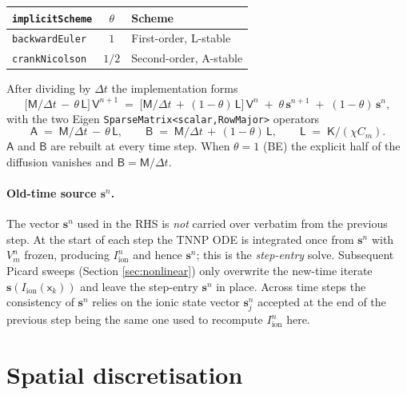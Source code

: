 \documentclass[11pt,a4paper]{article}
\newcommand{\Vm}{V_{m}}
\newcommand{\Iion}{I_{\text{ion}}}
\newcommand{\Aimp}{\mathsf{A}}
\newcommand{\Bimp}{\mathsf{B}}
\newcommand{\Mmass}{\mathsf{M}}
\newcommand{\Kstif}{\mathsf{K}}
\newcommand{\Lop}{\mathsf{L}}
\newcommand{\code}[1]{\texttt{\small #1}}
\begin{document}
\begin{center}
\begin{tabular}{@{}lcl@{}}
\toprule
\code{implicitScheme} & $\theta$ & Scheme \\
\midrule
\code{backwardEuler} & $1$   & First-order, L-stable \\
\code{crankNicolson} & $1/2$ & Second-order, A-stable \\
\bottomrule
\end{tabular}
\end{center}

After dividing by $\Delta t$ the implementation forms
\begin{equation}
  \bigl[\Mmass/\Delta t \,-\, \theta\, \Lop\bigr]\, \mathsf{V}^{n+1}
   \;=\;
   \bigl[\Mmass/\Delta t \,+\, (1-\theta)\, \Lop\bigr]\, \mathsf{V}^{n}
   \;+\; \theta\, \mathbf{s}^{n+1}
   \;+\; (1-\theta)\, \mathbf{s}^{n},
\end{equation}
with the two Eigen \code{SparseMatrix<scalar,RowMajor>} operators
\begin{equation}
  \Aimp \;=\; \Mmass/\Delta t \,-\, \theta\, \Lop,
   \qquad
  \Bimp \;=\; \Mmass/\Delta t \,+\, (1-\theta)\, \Lop,
   \qquad
   \Lop \;=\; \Kstif/(\chi C_{m}).
\end{equation}
$\Aimp$ and $\Bimp$ are rebuilt at every time step. When $\theta = 1$
(BE) the explicit half of the diffusion vanishes and
$\Bimp = \Mmass/\Delta t$.

\paragraph{Old-time source $\mathbf{s}^{n}$.}
The vector $\mathbf{s}^{n}$ used in the RHS is \emph{not} carried over
verbatim from the previous step. At the start of each step the TNNP
ODE is integrated once from $\mathbf{s}^{n}$ with $\Vm^{n}$ frozen,
producing $\Iion^{n}$ and hence $\mathbf{s}^{n}$; this is the
\emph{step-entry} solve. Subsequent Picard sweeps (Section
\ref{sec:nonlinear}) only overwrite the new-time iterate
$\mathbf{s}(\Iion(\mathsf{x}_{k}))$ and leave the step-entry
$\mathbf{s}^{n}$ in place. Across time steps the consistency of
$\mathbf{s}^{n}$ relies on the ionic state vector
$\mathbf{s}_{\!j}^{n}$ accepted at the end of the previous step being
the same one used to recompute $\Iion^{n}$ here.

\section{Spatial discretisation}
\end{document}

